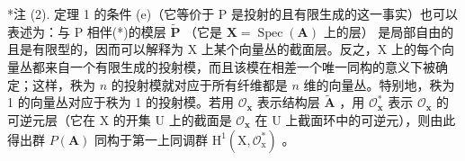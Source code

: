 *注 (2). 定理 1 的条件 (e)（它等价于 P 是投射的且有限生成的这一事实）也可以表述为：与 P 相伴(*)的模层 \(\tilde{\mathbf{P}}\) （它是 \(\mathbf{X} = \operatorname{Spec}(\mathbf{A})\) 上的层） 是局部自由的且是有限型的，因而可以解释为 X 上某个向量丛的截面层。反之，X 上的每个向量丛都来自一个有限生成的投射模，而且该模在相差一个唯一同构的意义下被确定；这样，秩为 \(n\) 的投射模就对应于所有纤维都是 \(n\) 维的向量丛。特别地，秩为 1 的向量丛对应于秩为 1 的投射模。若用 \(\mathcal{O}_{\mathbf{x}}\) 表示结构层 \(\tilde{\mathbf{A}}\) ，用 \(\mathcal{O}_{\mathbf{x}}^{*}\) 表示 \(\mathcal{O}_{\mathbf{x}}\) 的可逆元层（它在 X 的开集 U 上的截面是 \(\mathcal{O}_{\mathbf{x}}\) 在 U 上截面环中的可逆元），则由此得出群 \(P(\mathbf{A})\) 同构于第一上同调群 \(\mathrm{H}^1 (\mathrm{X},\mathcal{O}_\mathrm{x}^*)\) 。

